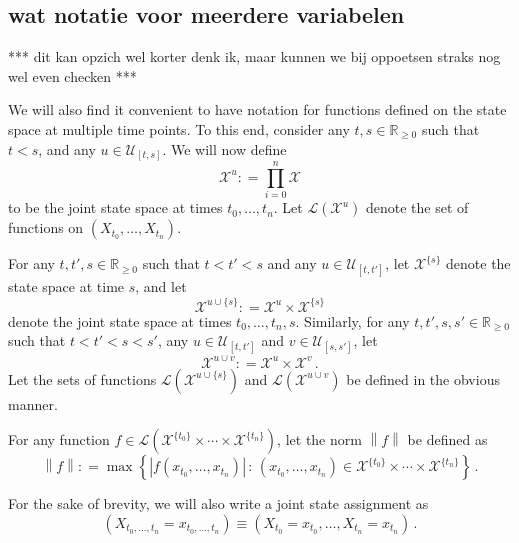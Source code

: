 \documentclass[10pt]{paper}
\theoremstyle{definition}
\newcommand{\reals}{\mathbb{R}}
\newcommand{\realsnonneg}{\reals_{\geq 0}}
\newcommand{\states}{\mathcal{X}}
\newcommand{\gambles}{\mathcal{L}}
\newcommand{\norm}[1]{\left\lVert #1 \right\rVert}
\newcommand{\abs}[1]{\left\vert #1 \right\vert}
\newcommand{\coloneqq}{:\!=}
\begin{document}
\subsection{wat notatie voor meerdere variabelen}\label{sec:multivar_notation}

*** dit kan opzich wel korter denk ik, maar kunnen we bij oppoetsen straks nog wel even checken ***

We will also find it convenient to have notation for functions defined on the state space at multiple time points.
To this end, consider any $t,s\in\realsnonneg$ such that $t<s$, and any $u\in\mathcal{U}_{[t,s]}$. We will now define
\begin{equation*}
\states^u\coloneqq \prod_{i=0}^n\states
\end{equation*}
to be the joint state space at times $t_0,\ldots,t_n$. Let $\gambles(\states^u)$ denote the set of functions on $(X_{t_0},\ldots,X_{t_n})$.

For any $t,t',s\in\realsnonneg$ such that $t<t'<s$ and any $u\in\mathcal{U}_{[t,t']}$, let $\states^{\{s\}}$ denote the state space at time $s$, and let
\begin{equation*}
\states^{u\cup\{s\}} \coloneqq \states^u\times\states^{\{s\}}
\end{equation*}
denote the joint state space at times $t_0,\ldots,t_n,s$. Similarly, for any $t,t',s,s'\in\realsnonneg$ such that $t<t'<s<s'$, any $u\in\mathcal{U}_{[t,t']}$ and $v\in\mathcal{U}_{[s,s']}$, let
\begin{equation*}
\states^{u\cup v}\coloneqq\states^u\times\states^v\,.
\end{equation*}
Let the sets of functions $\gambles(\states^{u\cup\{s\}})$ and $\gambles(\states^{u\cup v})$ be defined in the obvious manner.

For any function $f\in\gambles(\states^{\{t_0\}}\times\cdots\times\states^{\{t_n\}})$, let the norm $\norm{f}$ be defined as
\begin{equation*}
\norm{f} \coloneqq \max\left\{ \abs{f(x_{t_0},\ldots,x_{t_n})}\,:\,(x_{t_0},\ldots,x_{t_n})\in \states^{\{t_0\}}\times\cdots\times\states^{\{t_n\}}\right\}\,.
\end{equation*}

For the sake of brevity, we will also write a joint state assignment as
\begin{equation*}
\left(X_{t_0,\ldots,t_n}=x_{t_0,\ldots,t_n}\right)\equiv (X_{t_0}=x_{t_0},\ldots,X_{t_n}=x_{t_n})\,.
\end{equation*}
\end{document}
